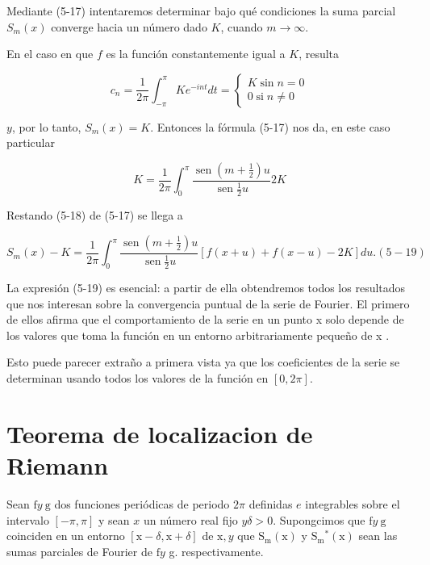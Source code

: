 \documentclass[10pt]{article}
\theoremstyle{plain}
\theoremstyle{definition}
\theoremstyle{remark}
\begin{document}
Mediante (5-17) intentaremos determinar bajo qué condiciones la suma parcial $S_{m}(x)$ converge hacia un número dado $K$, cuando $m \rightarrow \infty$.

En el caso en que $f$ es la función constantemente igual a $K$, resulta

$$
c_{n}=\frac{1}{2 \pi} \int_{-\pi}^{\pi} K e^{-i n t} d t=\left\{\begin{array}{l}
K \sin n=0 \\
0 \operatorname{si} n \neq 0
\end{array}\right.
$$

$y$, por lo tanto, $S_{m}(x)=K$. Entonces la fórmula (5-17) nos da, en este caso particular


\begin{equation*}
K=\frac{1}{2 \pi} \int_{0}^{\pi} \frac{\operatorname{sen}\left(m+\frac{1}{2}\right) u}{\operatorname{sen} \frac{1}{2} u} 2 K \tag{5•18}
\end{equation*}


Restando (5-18) de (5-17) se llega a

$$
S_{m}(x)-K=\frac{1}{2 \pi} \int_{0}^{\pi} \frac{\operatorname{sen}\left(m+\frac{1}{2}\right) u}{\operatorname{sen} \frac{1}{2} u}[f(x+u)+f(x-u)-2 K] d u .(5-19)
$$

La expresión (5-19) es esencial: a partir de ella obtendremos todos los resultados que nos interesan sobre la convergencia puntual de la serie de Fourier. El primero de ellos afirma que el comportamiento de la serie en un punto x solo depende de los valores que toma la función en un entorno arbitrariamente pequeño de x .

Esto puede parecer extraño a primera vista ya que los coeficientes de la serie se determinan usando todos los valores de la función en $[0,2 \pi]$.

\section*{Teorema de localizacion de Riemann}
Sean $\mathrm{f} y \mathrm{~g}$ dos funciones periódicas de periodo $2 \pi$ definidas $e$ integrables sobre el intervalo $[-\pi, \pi]$ y sean $x$ un número real fijo $y \delta>0$. Supongcimos que $\mathrm{f} y \mathrm{~g}$ coinciden en un entorno $[\mathrm{x}-\delta, \mathrm{x}+\delta]$ de $\mathrm{x}, y$ que $\mathrm{S}_{\mathrm{m}}(\mathrm{x})$ y $\mathrm{S}_{\mathrm{m}}{ }^{*}(\mathrm{x})$ sean las sumas parciales de Fourier de $\mathrm{f} y$ g. respectivamente.
\end{document}
